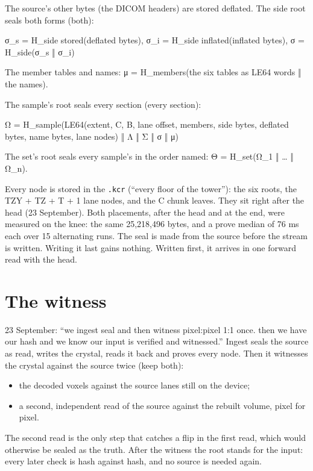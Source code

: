 The source's other bytes (the DICOM headers) are stored deflated. The side root seals both forms (both):

σ\_\allowbreak{}s = H\_\allowbreak{}side stored(deflated bytes),  σ\_\allowbreak{}i = H\_\allowbreak{}side inflated(inflated bytes),  σ = H\_\allowbreak{}side(σ\_\allowbreak{}s ‖ σ\_\allowbreak{}i)

The member tables and names: μ = H\_\allowbreak{}members(the six tables as LE64 words ‖ the names).

The sample's root seals every section (every section):

Ω = H\_\allowbreak{}sample(LE64(extent, C, B, lane offset, members, side bytes, deflated bytes, name bytes, lane nodes) ‖ Λ ‖ Σ ‖ σ ‖ μ)

The set's root seals every sample's in the order named: Θ = H\_\allowbreak{}set(Ω\_\allowbreak{}1 ‖ … ‖ Ω\_\allowbreak{}n).

Every node is stored in the \texttt{.\allowbreak{}kcr} (“every floor of the tower”): the six roots, the TZY + TZ + T + 1 lane nodes, and the C chunk leaves. They sit right after the head (23 September). Both placements, after the head and at the end, were measured on the knee: the same 25,218,496 bytes, and a prove median of 76 ms each over 15 alternating runs. The seal is made from the source before the stream is written. Writing it last gains nothing. Written first, it arrives in one forward read with the head.

\section{\texorpdfstring{The witness}{The witness}}

23 September: “we ingest seal and then witness pixel:pixel 1:1 once. then we have our hash and we know our input is verified and witnessed.” Ingest seals the source as read, writes the crystal, reads it back and proves every node. Then it witnesses the crystal against the source twice (keep both):

\begin{itemize}
\item the decoded voxels against the source lanes still on the device;
\item a second, independent read of the source against the rebuilt volume, pixel for pixel.
\end{itemize}

The second read is the only step that catches a flip in the first read, which would otherwise be sealed as the truth. After the witness the root stands for the input: every later check is hash against hash, and no source is needed again.

